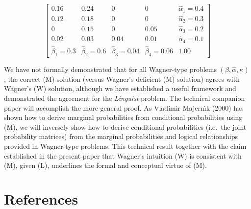 \documentclass[12pt]{article}
\begin{document}
\begin{equation}
  \label{eq:p11}
      \left[
      \begin{array}{ccccc}
        0.16 & 0.24 & 0 & 0 & \hat{\alpha}_{1}=0.4 \\
        0.12 & 0.18 & 0 & 0 & \hat{\alpha}_{2}=0.3 \\
        0 & 0.15 & 0 & 0.05 & \hat{\alpha}_{3}=0.2 \\
        0.02 & 0.03 & 0.04 & 0.01 & \hat{\alpha}_{4}=0.1 \\
        \hat{\beta}_{1}=0.3 & \hat{\beta}_{2}=0.6 & \hat{\beta}_{3}=0.04 & \hat{\beta}_{4}=0.06 & 1.00
      \end{array}
\right]
\end{equation}

We have not formally demonstrated that for all Wagner-type problems
$(\beta,\hat{\alpha},\kappa)$, the correct (M) solution (versus
Wagner's deficient (M) solution) agrees with Wagner's (W) solution,
although we have established a useful framework and demonstrated the
agreement for the \emph{Linguist} problem. The technical companion
paper will accomplish the more general proof. As Vladim{\'\i}r
Majern{\'\i}k (2000) has shown how to derive marginal probabilities from
conditional probabilities using (M), we
will inversely show how to derive conditional probabilities (i.e.\ the
joint probability matrices) from the marginal probabilities and
logical relationships provided in Wagner-type problems. This technical
result together with the claim established in the present paper that
Wagner's intuition (W) is consistent with (M), given (L), underlines
the formal and conceptual virtue of (M).

\newpage

\section{References}
\label{References}

\nocite{*} 
% 


\end{document}
